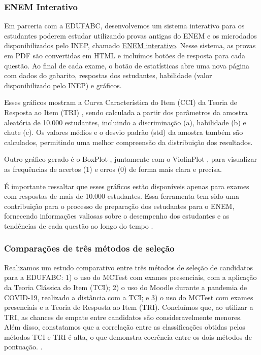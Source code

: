 \subsubsection{ENEM Interativo}

Em parceria com a EDUFABC, desenvolvemos um sistema interativo para os estudantes poderem estudar utilizando provas antigas do ENEM e os microdados disponibilizados pelo INEP, chamado \href{http://mctest.ufabc.edu.br:8000/ENEM}{ENEM interativo}. Nesse sistema, as provas em PDF são convertidas em HTML e incluímos botões de resposta para cada questão. Ao final de cada exame, o botão de estatísticas abre uma nova página com dados do gabarito, respostas dos estudantes, habilidade (valor disponibilizado pelo INEP) e gráficos.

Esses gráficos mostram a Curva Característica do Item (CCI) da Teoria de Resposta ao Item (TRI) \cite{birnbaum1968some}, sendo calculada a partir dos parâmetros da amostra aleatória de 10.000 estudantes, incluindo a discriminação (a), habilidade (b) e chute (c). Os valores médios e o desvio padrão (std) da amostra também são calculados, permitindo uma melhor compreensão da distribuição dos resultados.

Outro gráfico gerado é o BoxPlot \cite{jw1977exploratory}, juntamente com o ViolinPlot \cite{hintze1998violin}, para visualizar as frequências de acertos (1) e erros (0) de forma mais clara e precisa.

É importante ressaltar que esses gráficos estão disponíveis apenas para exames com respostas de mais de 10.000 estudantes. Essa ferramenta tem sido uma contribuição para o processo de preparação dos estudantes para o ENEM, fornecendo informações valiosas sobre o desempenho dos estudantes e as tendências de cada questão ao longo do tempo \cite{2021:Zampirolli.Junior.ea}.

\subsubsection{Comparações de três métodos de seleção}

Realizamos um estudo comparativo entre três métodos de seleção de candidatos para a EDUFABC: 1) o uso do MCTest com exames presenciais, com a aplicação da Teoria Clássica do Item (TCI); 2) o uso do Moodle durante a pandemia de COVID-19, realizado a distância com a TCI; e 3) o uso do MCTest com exames presenciais e a Teoria de Resposta ao Item (TRI). Concluímos que, ao utilizar a TRI, as chances de empate entre candidatos são consideravelmente menores. Além disso, constatamos que a correlação entre as classificações obtidas pelos métodos TCI e TRI é alta, o que demonstra coerência entre os dois métodos de pontuação. \cite{2021:Zampirolli.Batista.ea}.



